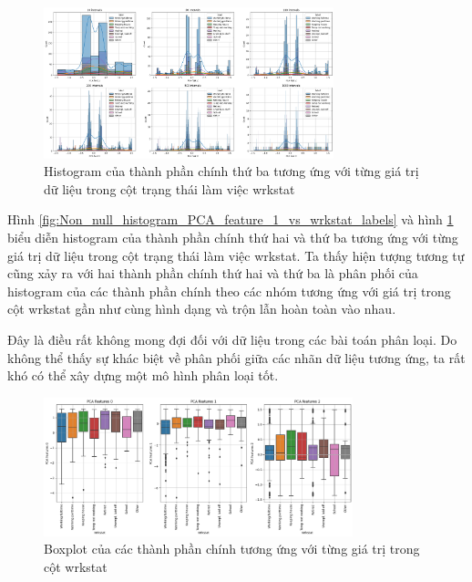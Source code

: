 \begin{figure}[H]
    \centering
    \includegraphics[width=0.75\textwidth]{figures/Thanh/Data_Analysis/Non_null_histogram_PCA_feature_2_vs_wrkstat_labels.png}
    \caption{Histogram của thành phần chính thứ ba tương ứng với từng giá trị dữ liệu trong cột trạng thái làm việc wrkstat}
    \label{fig:Non_null_histogram_PCA_feature_2_vs_wrkstat_labels}
\end{figure}


Hình \ref{fig:Non_null_histogram_PCA_feature_1_vs_wrkstat_labels} và hình \ref{fig:Non_null_histogram_PCA_feature_2_vs_wrkstat_labels} biểu diễn histogram của thành phần chính thứ hai và thứ ba tương ứng với từng giá trị dữ liệu trong cột trạng thái làm việc wrkstat.
Ta thấy hiện tượng tương tự cũng xảy ra với hai thành phần chính thứ hai và thứ ba là phân phối của histogram của các thành phần chính theo các nhóm tương ứng với giá trị trong cột wrkstat gần như cùng hình dạng và trộn lẫn hoàn toàn vào nhau.

Đây là điều rất không mong đợi đối với dữ liệu trong các bài toán phân loại.
Do không thể thấy sự khác biệt về phân phối giữa các nhãn dữ liệu tương ứng, ta rất khó có thể xây dựng một mô hình phân loại tốt.

\begin{figure}[H]
    \centering
    \includegraphics[width=0.8\textwidth]{figures/Thanh/Data_Analysis/Non_null_boxplot_PCA_features_vs_wrkstat_labels.png}
    \caption{Boxplot của các thành phần chính tương ứng với từng giá trị trong cột wrkstat}
    \label{fig:Non_null_boxplot_PCA_features_vs_wrkstat_labels}
\end{figure}

